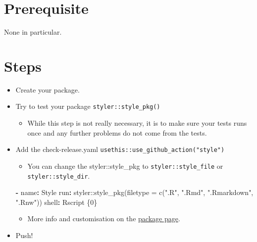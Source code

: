 \documentclass[
]{book}
\newenvironment{Shaded}{\begin{snugshade}}{\end{snugshade}}
\newcommand{\AttributeTok}[1]{\textcolor[rgb]{0.77,0.63,0.00}{#1}}
\newcommand{\FunctionTok}[1]{\textcolor[rgb]{0.00,0.00,0.00}{#1}}
\newcommand{\KeywordTok}[1]{\textcolor[rgb]{0.13,0.29,0.53}{\textbf{#1}}}
\providecommand{\tightlist}{%
  \setlength{\itemsep}{0pt}\setlength{\parskip}{0pt}}
\begin{document}
\hypertarget{prerequisite-2}{%
\section{Prerequisite}\label{prerequisite-2}}

None in particular.

\hypertarget{steps-2}{%
\section{Steps}\label{steps-2}}

\begin{itemize}
\item
  Create your package.
\item
  Try to test your package \texttt{styler::style\_pkg()}

  \begin{itemize}
  \tightlist
  \item
    While this step is not really necessary, it is to make sure your tests runs once and any further problems do not come from the tests.
  \end{itemize}
\item
  Add the check-release.yaml \texttt{usethis::use\_github\_action("style")}

  \begin{itemize}
  \tightlist
  \item
    You can change the styler::style\_pkg to \texttt{styler::style\_file} or \texttt{styler::style\_dir}.
  \end{itemize}

\begin{Shaded}
\begin{Highlighting}[]
\AttributeTok{  }\KeywordTok{{-}}\AttributeTok{ }\FunctionTok{name}\KeywordTok{:}\AttributeTok{ Style}
\AttributeTok{    }\FunctionTok{run}\KeywordTok{:}\AttributeTok{ styler::style\_pkg(filetype = c(".R", ".Rmd", ".Rmarkdown", ".Rnw"))}
\AttributeTok{    }\FunctionTok{shell}\KeywordTok{:}\AttributeTok{ Rscript \{0\}}
\end{Highlighting}
\end{Shaded}

  \begin{itemize}
  \tightlist
  \item
    More info and customisation on the \href{https://styler.r-lib.org/articles/styler.html}{package page}.\\
  \end{itemize}
\item
  Push!
\end{itemize}
\end{document}
